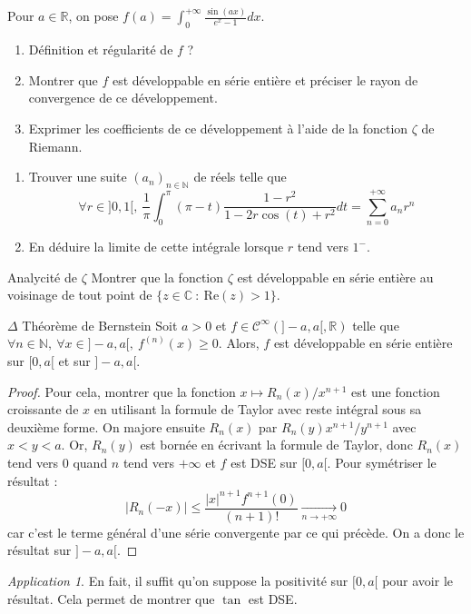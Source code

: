 \documentclass[french,a4paper]{article}
\newcommand{\N}{\mathbb{N}}
\newcommand{\R}{\mathbb{R}}
\newcommand{\C}{\mathbb{C}}
\theoremstyle{plain}
\theoremstyle{definition}
\theoremstyle{remark}
\newtheorem*{app}{Application}
\begin{document}
\begin{ex}[Moulin.SE.48]{}
	Pour $a\in\R$, on pose $f(a)=\displaystyle\int_{0}^{+\infty}\frac{\sin(ax)}{e^x-1}dx$.
	\begin{enumerate}
		\item Définition et régularité de $f$ ?
		\item Montrer que $f$ est développable en série entière et préciser le rayon de convergence de ce développement.
		\item Exprimer les coefficients de ce développement à l'aide de la fonction $\zeta$ de Riemann.
	\end{enumerate}
\end{ex}

\begin{ex}[Moulin.SE.49]{}
	\begin{enumerate}
		\item Trouver une suite $(a_n)_{n\in\N}$ de réels telle que $$\forall r\in]0,1[,\ \frac{1}{\pi}\int_{0}^{\pi}(\pi-t)\frac{1-r^2}{1-2r\cos(t)+r^2}dt=\sum_{n=0}^{+\infty}a_nr^n$$
		\item En déduire la limite de cette intégrale lorsque $r$ tend vers $1^-$.
	\end{enumerate}
\end{ex}

\begin{ex}[Moulin.SE.50]{Analycité de $\zeta$}
	Montrer que la fonction $\zeta$ est développable en série entière au voisinage de tout point de $\{z\in\C\ : \ \text{Re}(z)>1\}$.
\end{ex}

\begin{ex}{$\Delta$ Théorème de Bernstein} Soit $a>0$ et $f\in\mathcal{C}^\infty(]-a,a[,\R)$ telle que $\forall n\in\N,\ \forall x\in]-a,a[,\ f^{(n)}(x)\geqslant 0$. Alors, $f$ est développable en série entière sur $[0,a[$ et sur $]-a,a[$.
\end{ex} \begin{proof}
	Pour cela, montrer que la fonction $x\mapsto R_n(x)/x^{n+1}$ est une fonction croissante de $x$ en utilisant la formule de Taylor avec reste intégral sous sa deuxième forme. On majore ensuite $R_n(x)$ par $R_n(y)x^{n+1}/y^{n+1}$ avec $x<y<a$. Or, $R_n(y)$ est bornée en écrivant la formule de Taylor, donc $R_n(x)$ tend vers $0$ quand $n$ tend vers $+\infty$ et $f$ est DSE sur $[0,a[$. Pour symétriser le résultat : $$\lvert R_n(-x)\rvert \leqslant \frac{\lvert x\rvert^{n+1}f^{n+1}(0)}{(n+1)!}\xrightarrow[n\to+\infty]{}0$$ car c'est le terme général d'une série convergente par ce qui précède. On a donc le résultat sur $]-a,a[$.
\end{proof}
\begin{app}
	En fait, il suffit qu'on suppose la positivité sur $[0,a[$ pour avoir le résultat. Cela permet de montrer que $\tan$ est DSE. 
\end{app}
\end{document}
